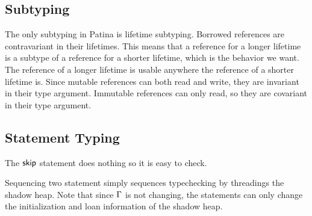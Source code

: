 
\subsection*{Subtyping}
The only subtyping in Patina is lifetime subtyping.
Borrowed references are contravariant in their lifetimes.
This means that a reference for a longer lifetime is a 
subtype of a reference for a shorter lifetime, which is the behavior we want.
The reference of a longer lifetime is usable anywhere the reference of a shorter lifetime is.
Since mutable references can both read and write, they are invariant in their type argument.
Immutable references can only read, so they are covariant in their type argument.
\newline




\subsection*{Statement Typing}
\newline

The $\nop$ statement does nothing so it is easy to check.

\begin{mathpar}
\end{mathpar}

Sequencing two statement simply sequences typechecking by threadings the shadow heap.
Note that since $\gG$ is not changing, the statements can only change the initialization
and loan information of the shadow heap.


